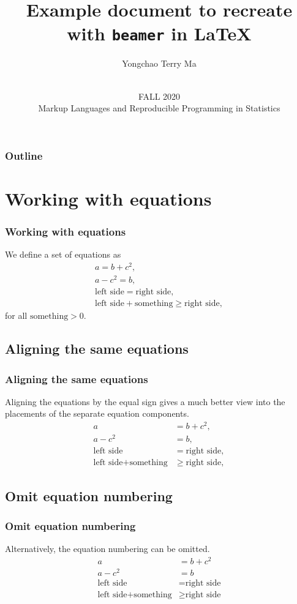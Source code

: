 \documentclass[aspectratio=169]{beamer}
\title[Example] {Example document to recreate with \texttt{beamer} in \LaTeX}
\author{Yongchao Terry Ma}
\date
{\vspace{.5 in}\\ FALL 2020 \\ Markup Languages and Reproducible Programming in Statistics  \vskip6mm}
\begin{document}
\begin{frame}
\titlepage
\end{frame}

\begin{frame}
\frametitle{Outline}
\tableofcontents
\end{frame}

\section{Working with equations}
\begin{frame}
\frametitle{Working with equations}
	We define a set of equations as
	\begin{gather}
		a=b+c^2, \\
		a-c^2=b, \\
    		\text{left side} = \text{right side}, \\
    		\text{left side} + \text{something} \geq \text{right side},
	\end{gather}
	for all $\text{something} > 0$.
\end{frame}

\subsection{Aligning the same equations}
\begin{frame}
\frametitle{Aligning the same equations}
	Aligning the equations by the equal sign gives a much better view into the placements of the separate equation components.
	\begin{align}
		a&=b+c^2, \\
		a-c^2&=b, \\
    		\text{left side} &= \text{right side}, \\
    		\text{left side} + \text{something} &\geq \text{right side},
	\end{align}
\end{frame}

\subsection{Omit equation numbering}
\begin{frame}
\frametitle{Omit equation numbering}
	Alternatively, the equation numbering can be omitted.
	\begin{align*}
		a&=b+c^2 \\
		a-c^2&=b \\
    		\text{left side} &= \text{right side} \\
    		\text{left side} + \text{something} &\geq \text{right side}
	\end{align*}
\end{frame}
\end{document}
